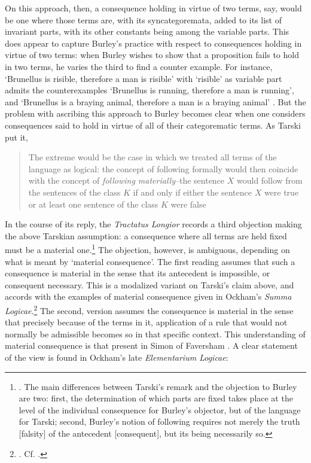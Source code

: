 \documentclass[]{article}
\begin{document}
On this approach, then, a consequence holding in virtue of two terms, say, would be one where those terms are, with its syncategoremata, added to its list of invariant parts, with its other constants being among the variable parts. This does appear to capture Burley's practice with respect to consequences holding in virtue of two terms: when Burley wishes to show that a proposition fails to hold in two terms, he varies the third to find a counter example. For instance, `Brunellus is risible, therefore a man is risible' with `risible' as variable part admits the counterexamples `Brunellus is running, therefore a man is running', and `Brunellus is a braying animal, therefore a man is a braying animal' \cite[84.13-15]{BurleyDPAL}. But the problem with ascribing this approach to Burley becomes clear when one considers consequences said to hold in virtue of all of their categorematic terms. As Tarski put it, 
\begin{quote}
	The extreme would be the case in which we treated all terms of the language as logical: the concept of following formally would then coincide with the concept of \textit{following materially}--the sentence $X$ would follow from the sentences of the class $K$ if and only if either the sentence $X$ were true or at least one sentence of the class $K$ were false \cite[pp. 188-189]{Tarski2002}
\end{quote}

In the course of its reply, the \textit{Tractatus Longior} records a third objection making the above Tarskian assumption: a consequence where all terms are held fixed must be a material one.\footnote{\cite[p. 86.4-9]{BurleyDPAL}. The main differences between Tarski's remark and the objection to Burley are two: first, the determination of which parts are fixed takes place at the level of the individual consequence for Burley's objector, but of the language for Tarski; second, Burley's notion of following requires not merely the truth [falsity] of the antecedent [consequent], but its being necessarily so.} The objection, however, is ambiguous, depending on what is meant by `material consequence'. The first reading assumes that such a consequence is material in the sense that its antecedent is impossible, or consequent necessary. This is a modalized variant on Tarski's claim above, and accords with the examples of material consequence given in Ockham's \textit{Summa Logicae}.\footnote{\cite{OckhamSL}. Cf. \cite[p. 7, par. 18; ]{Green-Pedersen1980a}.} The second, version assumes the consequence is material in the sense that precisely because of the terms in it, application of a rule that would not normally be admissible becomes so in that specific context. This understanding of material consequence is that present in Simon of Faversham \cite[q. 36]{FavershamQE}. A clear statement of the view is found in Ockham's late \textit{Elementarium Logicae}:
\end{document}
